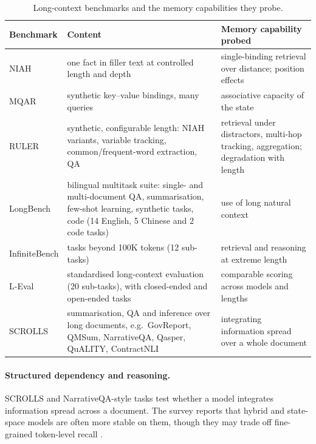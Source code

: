 \begin{table}[t]
\centering\small
\caption{Long-context benchmarks and the memory capabilities they probe.}
\label{tab:c02-benchmarks}
\begin{tabularx}{\textwidth}{@{}>{\raggedright\arraybackslash}p{2.6cm}>{\raggedright\arraybackslash}X>{\raggedright\arraybackslash}p{4.4cm}@{}}
\toprule
Benchmark & Content & Memory capability probed \\
\midrule
NIAH \citep{c02-kamradt2023niah} & one fact in filler text at controlled length and depth &
single-binding retrieval over distance; position effects \\
MQAR \citep{c02-arora2023zoology} & synthetic key--value bindings, many queries &
associative capacity of the state \\
RULER \citep{hsieh2024ruler} & synthetic, configurable length: NIAH variants, variable tracking,
common/frequent-word extraction, QA & retrieval under distractors, multi-hop tracking, aggregation;
degradation with length \\
LongBench \citep{bai2024longbench} & bilingual multitask suite: single- and multi-document QA,
summarisation, few-shot learning, synthetic tasks, code (14 English, 5 Chinese and 2 code tasks) &
use of long natural context \\
InfiniteBench \citep{zhang2024infbench} & tasks beyond 100K tokens (12 sub-tasks) & retrieval and
reasoning at extreme length \\
L-Eval \citep{an2023leval} & standardised long-context evaluation (20 sub-tasks), with
closed-ended and open-ended tasks & comparable scoring across models and lengths \\
SCROLLS \citep{shaham2022scrolls} & summarisation, QA and inference over long documents, e.g.\
GovReport, QMSum, NarrativeQA, Qasper, QuALITY, ContractNLI & integrating information spread over a
whole document \\
\bottomrule
\end{tabularx}
\end{table}

\paragraph{Structured dependency and reasoning.} SCROLLS and NarrativeQA-style tasks test whether a
model integrates information spread across a document. The survey reports that hybrid and
state-space models are often more stable on them, though they may trade off fine-grained token-level
recall \citep[\S V-C]{zhoubian2026memory}.

